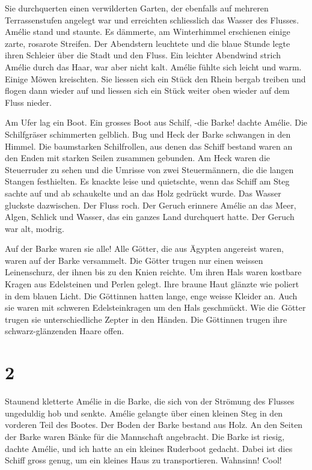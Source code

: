 \documentclass[11pt,titlepage,a5paper]{book}
\begin{document}
Sie durchquerten einen verwilderten Garten, der ebenfalls auf mehreren Terrassenstufen angelegt war und erreichten schliesslich das Wasser des Flusses. Amélie stand und staunte. Es dämmerte, am Winterhimmel erschienen einige zarte, rosarote Streifen. Der Abendstern leuchtete und die blaue Stunde legte ihren Schleier über die Stadt und den Fluss. Ein leichter Abendwind strich Amélie durch das Haar, war aber nicht kalt. Amélie fühlte sich leicht und warm. Einige Möwen kreischten. Sie liessen sich ein Stück den Rhein bergab treiben und flogen dann wieder auf und liessen sich ein Stück weiter oben wieder auf dem Fluss nieder. 

Am Ufer lag ein Boot. Ein grosses Boot aus Schilf, -die Barke! dachte Amélie. Die Schilfgräser schimmerten gelblich. Bug und Heck der Barke schwangen in den Himmel. Die baumstarken Schilfrollen, aus denen das Schiff bestand waren an den Enden mit starken Seilen zusammen gebunden. Am Heck waren die Steuerruder zu sehen und die Umrisse von zwei Steuermännern, die die langen Stangen festhielten. Es knackte leise und quietschte, wenn das Schiff am Steg sachte auf und ab schaukelte und an das Holz gedrückt wurde. Das Wasser gluckste dazwischen. Der Fluss roch. Der Geruch erinnere Amélie an das Meer, Algen, Schlick und Wasser, das ein ganzes Land durchquert hatte. Der Geruch war alt, modrig.

Auf der Barke waren sie alle! Alle Götter, die aus Ägypten angereist waren, waren auf der Barke versammelt. Die Götter trugen nur einen weissen Leinenschurz, der ihnen bis zu den Knien reichte. Um ihren Hals waren kostbare Kragen aus Edelsteinen und Perlen gelegt. Ihre braune Haut glänzte wie poliert in dem blauen Licht. Die Göttinnen hatten lange, enge weisse Kleider an. Auch sie waren mit schweren Edelsteinkragen um den Hals geschmückt. Wie die Götter trugen sie unterschiedliche Zepter in den Händen. Die Göttinnen trugen ihre schwarz-glänzenden Haare offen. 

\section*{2}

Staunend kletterte Amélie in die Barke, die sich von der Strömung des Flusses ungeduldig hob und senkte. Amélie gelangte über einen kleinen Steg in den  vorderen Teil des Bootes. Der Boden der Barke bestand aus Holz. An den Seiten der Barke waren Bänke für die Mannschaft angebracht. Die Barke ist riesig, dachte Amélie, und ich hatte an ein kleines Ruderboot gedacht. Dabei ist dies Schiff gross genug, um ein kleines Haus zu transportieren. Wahnsinn! Cool!
\end{document}
